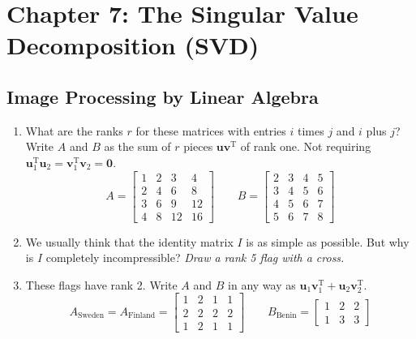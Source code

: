 \documentclass[14pt, a4paper]{article}
\begin{document}
\newpage

\section{Chapter 7: The Singular Value Decomposition (SVD)}

\subsection{Image Processing by Linear Algebra}
\begin{enumerate}
    \item What are the ranks $r$ for these matrices with entries $i$ times $j$ and $i$ plus $j$? Write $A$ and $B$ as the sum of $r$ pieces $\boldsymbol{u}\boldsymbol{v}^{\mathrm{T}}$ of rank one. Not requiring $\boldsymbol{u}_1^{\mathrm{T}}\boldsymbol{u}_2 = \boldsymbol{v}_1^{\mathrm{T}}\boldsymbol{v}_2 = \mathbf{0}$.
          \[
              A = \begin{bmatrix} 1 & 2 & 3 & 4 \\ 2 & 4 & 6 & 8 \\ 3 & 6 & 9 & 12 \\ 4 & 8 & 12 & 16 \end{bmatrix} \qquad B = \begin{bmatrix} 2 & 3 & 4 & 5 \\ 3 & 4 & 5 & 6 \\ 4 & 5 & 6 & 7 \\ 5 & 6 & 7 & 8 \end{bmatrix}
          \]

    \item We usually think that the identity matrix $I$ is as simple as possible. But why is $I$ completely incompressible? \textit{Draw a rank 5 flag with a cross.}

    \item These flags have rank 2. Write $A$ and $B$ in any way as $\boldsymbol{u}_1\boldsymbol{v}_1^{\mathrm{T}} + \boldsymbol{u}_2\boldsymbol{v}_2^{\mathrm{T}}$.
          \[
              A_{\text{Sweden}} = A_{\text{Finland}} = \begin{bmatrix} 1 & 2 & 1 & 1 \\ 2 & 2 & 2 & 2 \\ 1 & 2 & 1 & 1 \end{bmatrix} \qquad B_{\text{Benin}} = \begin{bmatrix} 1 & 2 & 2 \\ 1 & 3 & 3 \end{bmatrix}
          \]


\end{enumerate}
\end{document}
